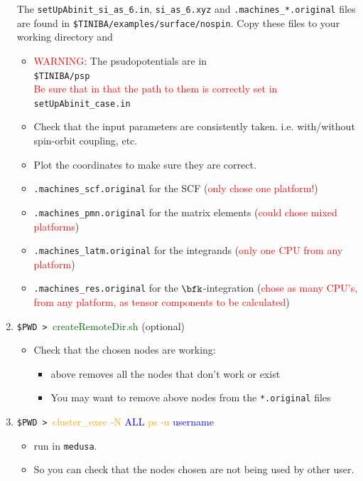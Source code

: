 \documentclass[12pt,leqno]{article}
\numberwithin{equation}{section}
\begin{document}
\begin{enumerate}
The 
\verb=setUpAbinit_si_as_6.in=, \verb=si_as_6.xyz= and
\verb=.machines_*.original= files are found in
\verb=$TINIBA/examples/surface/nospin=. Copy these files to your
working directory and
\begin{itemize}
\item \textcolor{red}{WARNING}: The psudopotentials are in\\
\verb=$TINIBA/psp=\\
\textcolor{red}{Be sure that in that the path to them is correctly set
in}\\
 \verb=setUpAbinit_case.in= 
\item {\small Check that the input parameters are consistently
    taken. i.e. with/without spin-orbit coupling, etc.}
\item {\small Plot the coordinates to make sure they are correct.}
\item \verb=.machines_scf.original= 
for the SCF (\textcolor{red}{only chose one
 platform!})
\item \verb=.machines_pmn.original= for the matrix elements (\textcolor{red}{could chose mixed platforms})
\item \verb=.machines_latm.original= for the integrands (\textcolor{red}{only one CPU from any platform})
\item \verb=.machines_res.original= for the $\bfk$-integration
  (\textcolor{red}{chose as many CPU's, from any platform,
as tensor components to be calculated})
\end{itemize}
\item \verb=$PWD > =\textcolor{darkgreen}{createRemoteDir.sh} (optional)
\begin{itemize}
\item Check that the chosen nodes are working:
\begin{itemize}
\item above removes all the nodes that  don't work or exist
\item You may want to remove above nodes from the \verb=*.original= files
\end{itemize}
\end{itemize}
\item{\small \verb=$PWD > =\textcolor{orange}{cluster\_exec -N}
   \textcolor{blue}{ALL} \textcolor{orange}{ps -u} \textcolor{blue}{username}
}
\begin{itemize}
\item {\small run in \verb=medusa=.}
\item {\small So you can check that the nodes chosen are not being used by other user.}

\end{itemize}
\end{enumerate}
\end{document}
